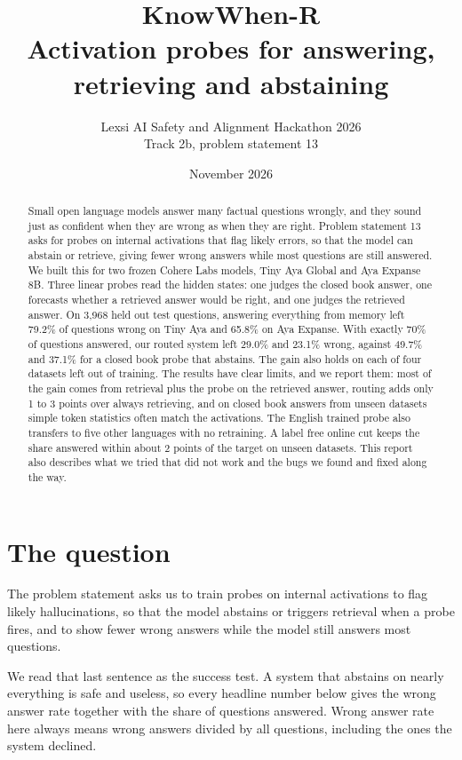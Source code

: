 \documentclass[11pt,a4paper]{article}
\title{\textbf{KnowWhen-R}\\[0.3em]\large Activation probes for answering, retrieving and abstaining}
\author{Lexsi AI Safety and Alignment Hackathon 2026\\Track 2b, problem statement 13}
\date{November 2026}
\begin{document}
\maketitle

\begin{abstract}
\noindent Small open language models answer many factual questions wrongly, and they sound just as confident when they are wrong as when they are right. Problem statement 13 asks for probes on internal activations that flag likely errors, so that the model can abstain or retrieve, giving fewer wrong answers while most questions are still answered. We built this for two frozen Cohere Labs models, Tiny Aya Global and Aya Expanse 8B. Three linear probes read the hidden states: one judges the closed book answer, one forecasts whether a retrieved answer would be right, and one judges the retrieved answer. On 3,968 held out test questions, answering everything from memory left 79.2\% of questions wrong on Tiny Aya and 65.8\% on Aya Expanse. With exactly 70\% of questions answered, our routed system left 29.0\% and 23.1\% wrong, against 49.7\% and 37.1\% for a closed book probe that abstains. The gain also holds on each of four datasets left out of training. The results have clear limits, and we report them: most of the gain comes from retrieval plus the probe on the retrieved answer, routing adds only 1 to 3 points over always retrieving, and on closed book answers from unseen datasets simple token statistics often match the activations. The English trained probe also transfers to five other languages with no retraining. A label free online cut keeps the share answered within about 2 points of the target on unseen datasets. This report also describes what we tried that did not work and the bugs we found and fixed along the way.
\end{abstract}

\section{The question}

The problem statement asks us to train probes on internal activations to flag likely hallucinations, so that the model abstains or triggers retrieval when a probe fires, and to show fewer wrong answers while the model still answers most questions.

We read that last sentence as the success test. A system that abstains on nearly everything is safe and useless, so every headline number below gives the wrong answer rate together with the share of questions answered. Wrong answer rate here always means wrong answers divided by all questions, including the ones the system declined.
\end{document}
